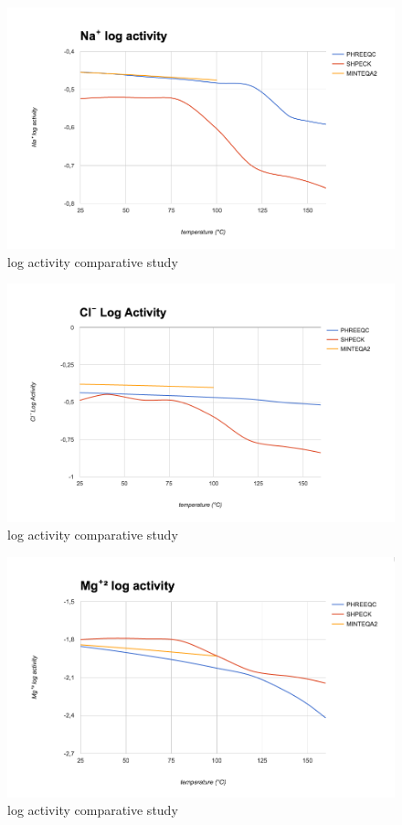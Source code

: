 \begin{figure}[ht!]
\centering
\includegraphics[width=140mm]{figures/na+.png}
\caption{ log activity comparative study}
\label{fig:na+}
\end{figure}

\begin{figure}[ht!]
\centering
\includegraphics[width=140mm]{figures/cl-.png}
\caption{ log activity comparative study}
\label{fig:cl-}
\end{figure}

\begin{figure}[ht!]
\centering
\includegraphics[width=140mm]{figures/mg+2.png}
\caption{ log activity comparative study}
\label{fig:mg+2}
\end{figure}

